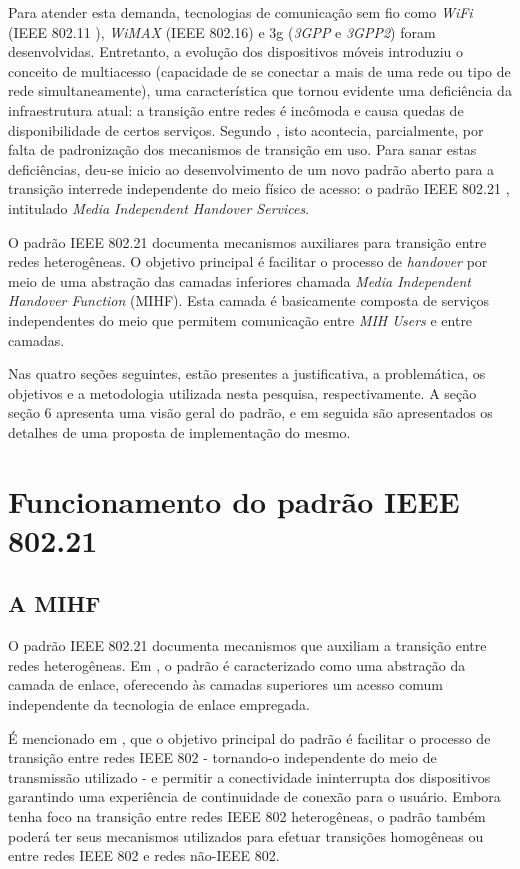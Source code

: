 \documentclass[12pt]{article}
\begin{document}
Para atender esta demanda, tecnologias de comunicação sem fio como 
\textit{WiFi} (IEEE 802.11 \cite{ieee:2007:80211}), \textit{WiMAX}
(IEEE 802.16\cite{ieee:2009:80216}) e 3g (\textit{3GPP} e \textit{3GPP2}) 
foram desenvolvidas.  Entretanto, a evolução dos dispositivos móveis 
introduziu o conceito de multiacesso (capacidade de se conectar a mais de uma 
rede ou tipo de rede simultaneamente), uma característica que tornou evidente 
uma deficiência da infraestrutura atual: a transição entre redes é incômoda e 
causa quedas de disponibilidade de certos serviços.  Segundo \cite{piri:2009}, 
isto acontecia, parcialmente, por falta de padronização dos mecanismos de 
transição em uso.  Para sanar estas deficiências, deu-se inicio ao 
desenvolvimento de um novo padrão aberto para a transição interrede 
independente do meio físico de acesso: o padrão IEEE 802.21 
\cite{ieee:2008:80221}, intitulado \textit{Media Independent Handover 
Services}.

O padrão IEEE 802.21 documenta mecanismos auxiliares para transição entre 
redes heterogêneas. O objetivo principal é facilitar o processo de 
\textit{handover} por meio de uma abstração das camadas inferiores chamada 
\textit{Media Independent Handover Function} (MIHF). Esta camada é basicamente 
composta de serviços independentes do meio que permitem comunicação entre 
\textit{MIH Users} e entre camadas.

Nas quatro seções seguintes, estão presentes a justificativa, a problemática, 
os objetivos e a metodologia utilizada nesta pesquisa, respectivamente. A 
seção seção 6 apresenta uma visão geral do padrão, e em seguida são 
apresentados os detalhes de uma proposta de implementação do mesmo.

\section{Funcionamento do padrão IEEE 802.21} \label{sec:padrao} %

\subsection{A MIHF}

O padrão IEEE 802.21 documenta mecanismos que auxiliam a transição entre redes 
heterogêneas.  Em \cite{idigital:2009}, o padrão é caracterizado como uma 
abstração da camada de enlace, oferecendo às camadas superiores um acesso 
comum independente da tecnologia de enlace empregada.

É mencionado em \cite{ieee:2008:80221}, que o objetivo principal do padrão é 
facilitar o processo de transição entre redes IEEE 802 - tornando-o 
independente do meio de transmissão utilizado - e permitir a conectividade 
ininterrupta dos dispositivos garantindo uma experiência de continuidade de 
conexão para o usuário.  Embora tenha foco na transição entre redes IEEE 802 
heterogêneas, o padrão também poderá ter seus mecanismos utilizados para 
efetuar transições homogêneas ou entre redes IEEE 802 e redes não-IEEE 802.  
\end{document}
